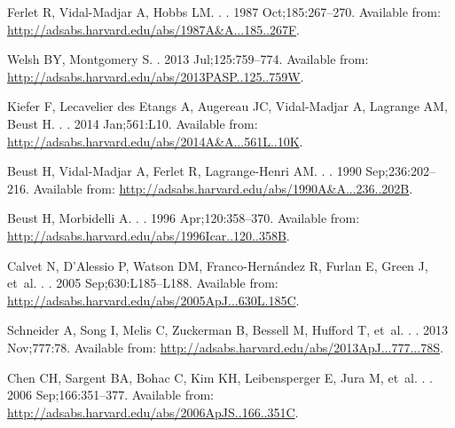 \documentclass[]{rsos}
\begin{document}
\begin{thebibliography}{10}
{Ferlet} R, {Vidal-Madjar} A, {Hobbs} LM.
.
\newblock \aap. 1987 Oct;185:267--270.
\newblock Available from:
  \url{http://adsabs.harvard.edu/abs/1987A&A...185..267F}.

{Welsh} BY, {Montgomery} S.
\newblock \pasp. 2013 Jul;125:759--774.
\newblock Available from:
  \url{http://adsabs.harvard.edu/abs/2013PASP..125..759W}.

{Kiefer} F, {Lecavelier des Etangs} A, {Augereau} JC, {Vidal-Madjar} A,
  {Lagrange} AM, {Beust} H.
.
\newblock \aap. 2014 Jan;561:L10.
\newblock Available from:
  \url{http://adsabs.harvard.edu/abs/2014A&A...561L..10K}.

{Beust} H, {Vidal-Madjar} A, {Ferlet} R, {Lagrange-Henri} AM.
.
\newblock \aap. 1990 Sep;236:202--216.
\newblock Available from:
  \url{http://adsabs.harvard.edu/abs/1990A&A...236..202B}.

{Beust} H, {Morbidelli} A.
.
\newblock \icarus. 1996 Apr;120:358--370.
\newblock Available from:
  \url{http://adsabs.harvard.edu/abs/1996Icar..120..358B}.

{Calvet} N, {D'Alessio} P, {Watson} DM, {Franco-Hern{\'a}ndez} R, {Furlan} E,
  {Green} J, et~al.
.
\newblock \apjl. 2005 Sep;630:L185--L188.
\newblock Available from:
  \url{http://adsabs.harvard.edu/abs/2005ApJ...630L.185C}.

{Schneider} A, {Song} I, {Melis} C, {Zuckerman} B, {Bessell} M, {Hufford} T,
  et~al.
.
\newblock \apj. 2013 Nov;777:78.
\newblock Available from:
  \url{http://adsabs.harvard.edu/abs/2013ApJ...777...78S}.

{Chen} CH, {Sargent} BA, {Bohac} C, {Kim} KH, {Leibensperger} E, {Jura} M,
  et~al.
.
\newblock \apjs. 2006 Sep;166:351--377.
\newblock Available from:
  \url{http://adsabs.harvard.edu/abs/2006ApJS..166..351C}.


\end{thebibliography}
\end{document}
